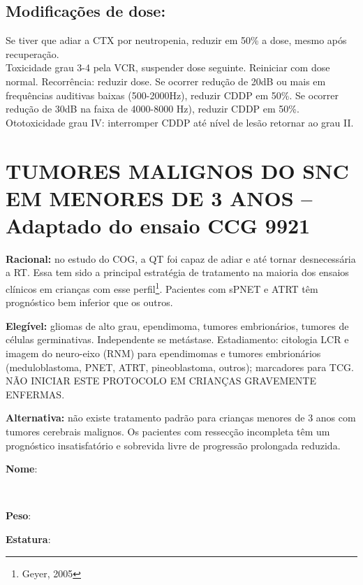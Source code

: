 \documentclass[11pt,a4paper,oldfontcommands]{memoir}
\def\entrywithlabel[#1]#2{\parbox{#1}{{\small #2:} \hrulefill}}
\begin{document}
\subsection{Modificações de dose:}
Se tiver que adiar a CTX por neutropenia, reduzir em 50\% a dose, mesmo após recuperação.\\
Toxicidade grau 3-4 pela VCR, suspender dose seguinte. Reiniciar com dose normal. Recorrência: reduzir dose.
Se ocorrer redução de 20dB ou mais em frequências auditivas baixas (500-2000Hz), reduzir CDDP em 50\%. Se ocorrer redução de 30dB na faixa de 4000-8000 Hz), reduzir CDDP em 50\%. Ototoxicidade grau IV: interromper CDDP até nível de lesão retornar ao grau II.\\
\cleardoublepage
\section{TUMORES MALIGNOS DO SNC EM MENORES DE 3 ANOS -- Adaptado do ensaio CCG 9921}
{\let\thefootnote\relax{}}
\small
\textbf{Racional:} no estudo do COG, a QT foi capaz de adiar e até tornar desnecessária a RT. Essa tem sido a principal estratégia de tratamento na maioria dos ensaios clínicos em crianças com esse perfil\footnote{Geyer, 2005}. Pacientes com sPNET e ATRT têm prognóstico bem inferior que os outros.

\textbf{Elegível:} gliomas de alto grau, ependimoma, tumores embrionários, tumores de células germinativas. Independente se metástase. Estadiamento: citologia LCR e imagem do neuro-eixo (RNM) para ependimomas e tumores embrionários (meduloblastoma, PNET, ATRT, pineoblastoma, outros); marcadores para TCG. NÃO INICIAR ESTE PROTOCOLO EM CRIANÇAS GRAVEMENTE ENFERMAS.

\textbf{Alternativa:} não existe tratamento padrão para crianças menores de 3 anos com tumores cerebrais malignos. Os pacientes com ressecção incompleta têm um prognóstico insatisfatório e sobrevida livre de progressão prolongada reduzida.
\\[0.4cm]
\entrywithlabel[1\hsize]{\textbf{Nome}}\hfill
\\[0.3cm]
\entrywithlabel[.45\hsize]{\textbf{Peso}}\hfill  \entrywithlabel[.45\hsize]{\textbf{Estatura}}
\end{document}
